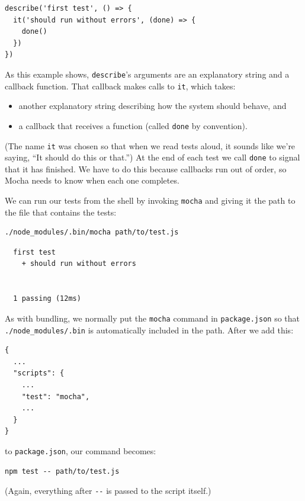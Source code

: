 \begin{verbatim}
describe('first test', () => {
  it('should run without errors', (done) => {
    done()
  })
})
\end{verbatim}

As this example shows, \texttt{describe}'s arguments are an explanatory
string and a callback function. That callback makes calls to
\texttt{it}, which takes:

\begin{itemize}
\tightlist
\item
  another explanatory string describing how the system should behave,
  and
\item
  a callback that receives a function (called \texttt{done} by
  convention).
\end{itemize}

(The name \texttt{it} was chosen so that when we read tests aloud, it
sounds like we're saying, ``It should do this or that.'') At the end of
each test we call \texttt{done} to signal that it has finished. We have
to do this because callbacks run out of order, so Mocha needs to know
when each one completes.

We can run our tests from the shell by invoking \texttt{mocha} and
giving it the path to the file that contains the tests:

\begin{verbatim}
./node_modules/.bin/mocha path/to/test.js
\end{verbatim}

\begin{verbatim}
  first test
    + should run without errors


  1 passing (12ms)
\end{verbatim}

As with bundling, we normally put the \texttt{mocha} command in
\texttt{package.json} so that \texttt{./node\_modules/.bin} is
automatically included in the path. After we add this:

\begin{verbatim}
{
  ...
  "scripts": {
    ...
    "test": "mocha",
    ...
  }
}
\end{verbatim}

to \texttt{package.json}, our command becomes:

\begin{verbatim}
npm test -- path/to/test.js
\end{verbatim}

(Again, everything after \texttt{-\/-} is passed to the script itself.)

